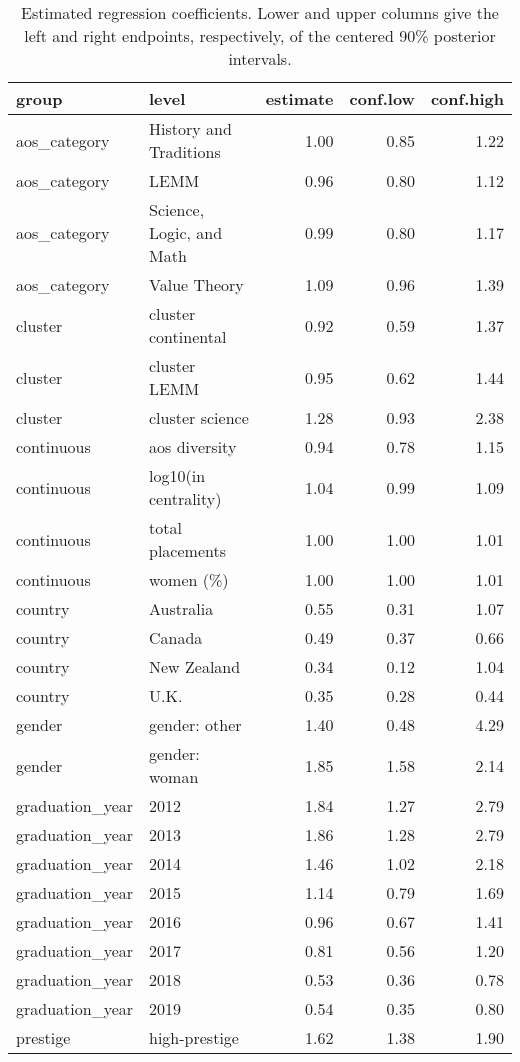 \begin{table}

\caption{\label{tab:estimates}Estimated regression coefficients.  Lower and upper columns give the left and right endpoints, respectively, of the centered 90\% posterior intervals.}
\centering
\begin{tabular}[t]{llrrr}
\toprule
group & level & estimate & conf.low & conf.high\\
\midrule
aos\_category & History and Traditions & 1.00 & 0.85 & 1.22\\
aos\_category & LEMM & 0.96 & 0.80 & 1.12\\
aos\_category & Science, Logic, and Math & 0.99 & 0.80 & 1.17\\
aos\_category & Value Theory & 1.09 & 0.96 & 1.39\\
cluster & cluster continental & 0.92 & 0.59 & 1.37\\
\addlinespace
cluster & cluster LEMM & 0.95 & 0.62 & 1.44\\
cluster & cluster science & 1.28 & 0.93 & 2.38\\
continuous & aos diversity & 0.94 & 0.78 & 1.15\\
continuous & log10(in centrality) & 1.04 & 0.99 & 1.09\\
continuous & total placements & 1.00 & 1.00 & 1.01\\
\addlinespace
continuous & women (\%) & 1.00 & 1.00 & 1.01\\
country & Australia & 0.55 & 0.31 & 1.07\\
country & Canada & 0.49 & 0.37 & 0.66\\
country & New Zealand & 0.34 & 0.12 & 1.04\\
country & U.K. & 0.35 & 0.28 & 0.44\\
\addlinespace
gender & gender: other & 1.40 & 0.48 & 4.29\\
gender & gender: woman & 1.85 & 1.58 & 2.14\\
graduation\_year & 2012 & 1.84 & 1.27 & 2.79\\
graduation\_year & 2013 & 1.86 & 1.28 & 2.79\\
graduation\_year & 2014 & 1.46 & 1.02 & 2.18\\
\addlinespace
graduation\_year & 2015 & 1.14 & 0.79 & 1.69\\
graduation\_year & 2016 & 0.96 & 0.67 & 1.41\\
graduation\_year & 2017 & 0.81 & 0.56 & 1.20\\
graduation\_year & 2018 & 0.53 & 0.36 & 0.78\\
graduation\_year & 2019 & 0.54 & 0.35 & 0.80\\
\addlinespace
prestige & high-prestige & 1.62 & 1.38 & 1.90\\
\bottomrule
\end{tabular}
\end{table}
